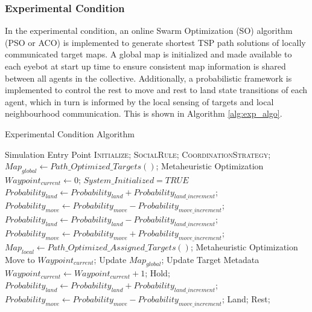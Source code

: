 \documentclass{report}
\begin{document}
\newpage

\subsubsection{Experimental Condition}
In the experimental condition, an online Swarm Optimization (SO) algorithm (PSO or ACO) is implemented to generate shortest TSP path solutions of locally communicated target maps. A global map is initialized and made available to each eyebot at start up time to ensure consistent map information is shared between all agents in the collective. Additionally, a probabilistic framework is implemented to control the rest to move and rest to land state transitions of each agent, which in turn is informed by the local sensing of targets and local neighbourhood communication. This is shown in Algorithm \ref{alg:exp_algo}.

\begin{algorithm}[H]
	\caption{Experimental Condition Algorithm}
	\label{alg:exp_algo}
	\begin{algorithmic}[1]
		 {} \Comment Simulation Entry Point
				\State \textsc{Initialize};
				\State \textsc{SocialRule};
				\State \textsc{CoordinationStrategy};
			\EndWhile
		\EndProcedure
		\\
				\State $Map_{global} \gets Path\_Optimized\_Targets()$; \Comment Metaheuristic Optimization
				\State $Waypoint_{current} \gets 0$;
				\State $System\_Initialized = TRUE$
			\EndIf
		\EndProcedure
		\\
					\State $Probability_{land} \gets Probability_{land} + Probability_{land\_increment}$;
					\State $Probability_{move} \gets Probability_{move} - Probability_{move\_increment}$;
					\State $Probability_{land} \gets Probability_{land} - Probability_{land\_increment}$;
					\State $Probability_{move} \gets Probability_{move} + Probability_{move\_increment}$;
				\EndIf
			\EndIf
		\EndProcedure
		\\
				\State $Map_{local} \gets Path\_Optimized\_Assigned\_Targets()$; \Comment Metaheuristic Optimization
				\State Move to $Waypoint_{current}$;
						\State Update $Map_{global}$; \Comment Update Target Metadata
						\State $Waypoint_{current} \gets Waypoint_{current} + 1$;
					\Else
						\State Hold;
					\EndIf
					\State $Probability_{land} \gets Probability_{land} + Probability_{land\_increment}$;
					\State $Probability_{move} \gets Probability_{move} - Probability_{move\_increment}$;
				\EndIf
				\State Land;
			\Else
				\State Rest;
			\EndIf
		\EndProcedure
	\end{algorithmic}
\end{algorithm}
\end{document}
